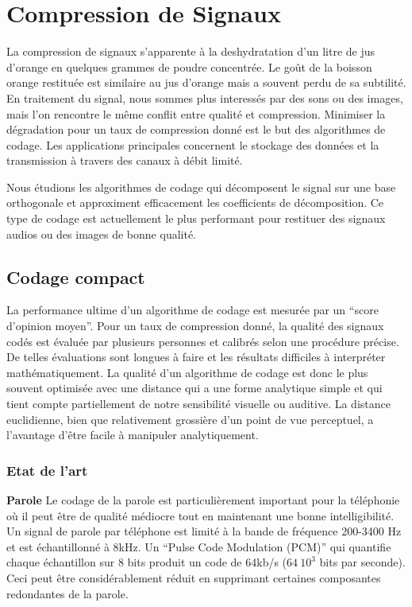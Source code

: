 \chapter{Compression de Signaux}
\label{comp-code-chap}

La compression de signaux s'apparente \`a la deshydratation d'un
litre de jus d'orange en quelques grammes de poudre concentr\'ee.
Le go\^ut de la boisson orange restitu\'ee est similaire au jus d'orange
mais a souvent perdu de sa subtilit\'e.
En traitement du signal, nous sommes plus interess\'es
par des sons ou des images, mais l'on rencontre le m\^eme
conflit entre qualit\'e et compression.
Minimiser la d\'egradation pour un taux de compression donn\'e est
le but des algorithmes de codage.
Les applications principales concernent le stockage des donn\'ees
et la transmission \`a travers des canaux \`a d\'ebit limit\'e.

Nous \'etudions les algorithmes de codage 
qui d\'ecomposent le
signal sur une base orthogonale et approximent efficacement les
coefficients de d\'ecomposition.
Ce type de codage est actuellement le plus performant pour
restituer des signaux audios ou des images de bonne qualit\'e.

\section{Codage compact}

La performance ultime d'un algorithme de codage est mesur\'ee par
un ``score d'opinion moyen''.
Pour un taux de compression donn\'e,
la qualit\'e des signaux cod\'es est \'evalu\'ee par plusieurs personnes
et calibr\'es selon une proc\'edure pr\'ecise.
De telles \'evaluations sont longues \`a faire et les r\'esultats 
difficiles 
\`a interpr\'eter math\'ematiquement. La qualit\'e d'un algorithme de codage
est donc le plus souvent optimis\'ee avec une distance qui
a une forme analytique simple et qui tient compte partiellement de
notre sensibilit\'e visuelle ou auditive.
La distance euclidienne, bien que relativement
grossi\`ere d'un point de vue perceptuel,
a l'avantage d'\^etre facile \`a manipuler analytiquement.


\subsection{Etat de l'art}
\label{stateofart}
\noindent
{\bf Parole}
Le codage de la parole est particuli\`erement important pour
la t\'el\'ephonie o\`u il peut \^etre de qualit\'e m\'ediocre tout en
maintenant une bonne intelligibilit\'e.
Un signal de parole par t\'el\'ephone est limit\'e \`a la bande de
fr\'equence 200-3400 Hz et est \'echantillonn\'e \`a 8kHz.
Un ``Pulse Code Modulation (PCM)'' qui quantifie chaque
\'echantillon sur
8 bits produit un code de 64kb/s ($64~10^3$ bits par seconde).
Ceci peut \^etre consid\'erablement r\'eduit en supprimant certaines
composantes redondantes de la parole.

